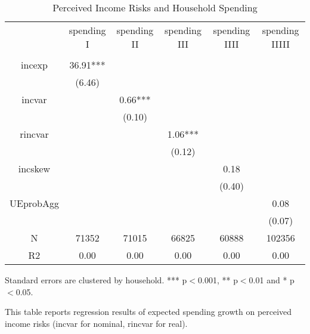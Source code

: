 
\begin{table}[p]
\centering
\begin{adjustbox}{width={0.9\textwidth}}
\begin{threeparttable}
\caption{Perceived Income Risks and Household Spending}
\label{spending_reg}\begin{tabular}{cccccc}
\toprule
{} & spending I & spending II & spending III & spending IIII & spending IIIII \\
          &            &             &              &               &                \\
\midrule
incexp    &   36.91*** &             &              &               &                \\
          &     (6.46) &             &              &               &                \\
incvar    &            &     0.66*** &              &               &                \\
          &            &      (0.10) &              &               &                \\
rincvar   &            &             &      1.06*** &               &                \\
          &            &             &       (0.12) &               &                \\
incskew   &            &             &              &          0.18 &                \\
          &            &             &              &        (0.40) &                \\
UEprobAgg &            &             &              &               &           0.08 \\
          &            &             &              &               &         (0.07) \\
N         &      71352 &       71015 &        66825 &         60888 &         102356 \\
R2        &       0.00 &        0.00 &         0.00 &          0.00 &           0.00 \\
\bottomrule
\end{tabular}
\begin{tablenotes}\item Standard errors are clustered by household. *** p$<$0.001, ** p$<$0.01 and * p$<$0.05. 
\item This table reports regression results of expected spending growth on perceived income risks (incvar for nominal, rincvar for real).
\end{tablenotes}
\end{threeparttable}
\end{adjustbox}
\end{table}
